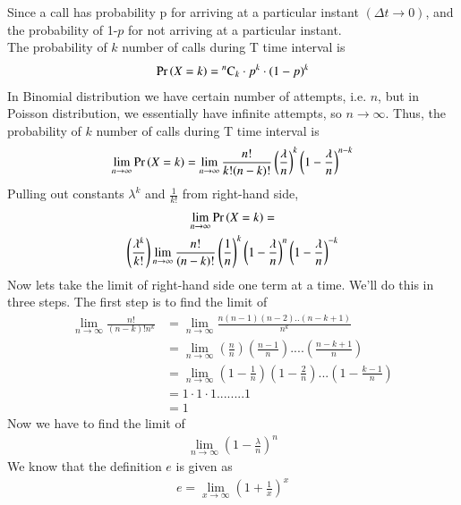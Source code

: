 \documentclass[journal,12pt,twocolumn]{IEEEtran}
\begin{document}
Since a call has probability p for arriving at a particular instant $(\Delta t\rightarrow 0)$, and the probability of 1-$p$ for not arriving at a particular instant.\\
The probability of $k$ number of calls during T time interval is 
\begin{align}
    \Pr\left(X=k\right)={}^{n}\mathrm{C}_{k}\cdot p^k\cdot(1-p)^k
\end{align}
In Binomial distribution we have certain number of attempts, i.e. $n$, but in Poisson distribution, we essentially have infinite attempts, so $n\rightarrow\infty$. Thus, the probability of $k$ number of calls during T time interval is
\begin{align}
   \lim_{n \to \infty}\Pr\left(X=k\right)=\lim_{n \to \infty}\frac{n!}{k!(n-k)!}\left(\frac{\lambda}{n}\right)^k\left(1-\frac{\lambda}{n}\right)^{n-k}
\end{align}
Pulling out constants $\lambda^k$ and $\frac{1}{k!}$ from right-hand side,
\begin{multline}  \label{5}
    \lim_{n \to \infty}\Pr\left(X=k\right)=\\
    \left(\frac{\lambda^k}{k!}\right)\lim_{n \to \infty}\frac{n!}{(n-k)!}\left(\frac{1}{n}\right)^k\left(1-\frac{\lambda}{n}\right)^n\left(1-\frac{\lambda}{n}\right)^{-k}
\end{multline}
Now lets take the limit of right-hand side one term at a time. We’ll do this in three steps. The first step is to find the limit of 
\begin{equation}
\begin{split}
     \lim_{n \to \infty}\frac{n!}{(n-k)!n^k}
     &= \lim_{n \to \infty}\frac{n(n-1)(n-2)..(n-k+1)}{n^k}\\
    & = \lim_{n \to\infty}\left(\frac{n}{n}\right)\left(\frac{n-1}{n}\right)....\left(\frac{n-k+1}{n}\right)\\
   &= \lim_{n \to \infty}\left(1-\frac{1}{n}\right)\left(1-\frac{2}{n}\right)...\left(1-\frac{k-1}{n}\right)\\
    &=1\cdot1\cdot1........1\\
    &=1   
    \end{split}
\end{equation}
Now we have to find the limit of 
\begin{align}
    \lim_{n \to \infty}\left(1-\frac{\lambda}{n}\right)^n 
\end{align}
We know that the definition $e$ is given as 
\begin{align}
    e=\lim_{x \to \infty}\left(1+\frac{1}{x}\right)^x
\end{align}
\end{document}

